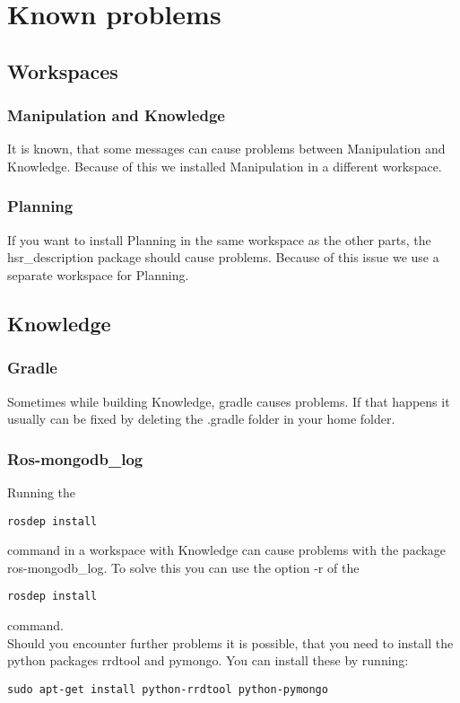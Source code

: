 \documentclass[main.tex]{subfiles}
\begin{document}
	\section{Known problems}
	\label{problems}
	\subsection{Workspaces}
	\subsubsection{Manipulation and Knowledge}
	It is known, that some messages can cause problems between Manipulation and Knowledge. Because of this we installed Manipulation in a different workspace.
	
	\subsubsection{Planning}
	If you want to install Planning in the same workspace as the other parts, the hsr\_description package should cause problems. Because of this issue we use a separate workspace for Planning.
	

	\subsection{Knowledge}
	\subsubsection{Gradle}
	Sometimes while building Knowledge, gradle causes problems.
	If that happens it usually can be fixed by deleting the .gradle folder in your home folder.
	
	\subsubsection{Ros-mongodb\_log}
	Running the \\
	\begin{lstlisting}
rosdep install
\end{lstlisting}
command in a workspace with Knowledge can cause problems with the package ros-mongodb\_log. To solve this you can use the option -r of the \\
\begin{lstlisting}
rosdep install
\end{lstlisting}
command.\\
Should you encounter further problems it is possible, that you need to install the  python packages rrdtool and pymongo. You can install these by running:\\
\begin{lstlisting}
sudo apt-get install python-rrdtool python-pymongo
\end{lstlisting}
\end{document}
